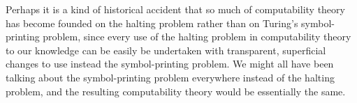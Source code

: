 \documentclass{amsart}
\begin{document}
Perhaps it is a kind of historical accident that so much of computability theory has become founded on the halting problem rather than on Turing's symbol-printing problem, since every use of the halting problem in computability theory to our knowledge can be easily be undertaken with transparent, superficial changes to use instead the symbol-printing problem. We might all have been talking about the symbol-printing problem everywhere instead of the halting problem, and the resulting computability theory would be essentially the same.

\printbibliography
\end{document}
